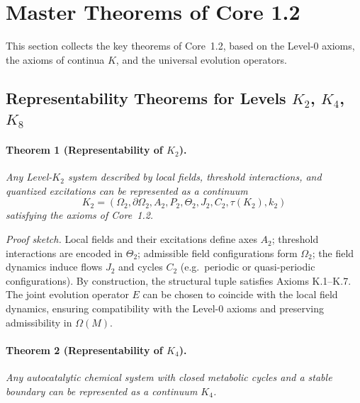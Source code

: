 \section{Master Theorems of Core 1.2}
\label{sec:theorems-master}

This section collects the key theorems of Core~1.2, based on the Level-0 axioms, the axioms of continua \(K\), and the universal evolution operators.

\subsection{Representability Theorems for Levels \texorpdfstring{\(K_2\)}{K_2}, \texorpdfstring{\(K_4\)}{K_4}, \texorpdfstring{\(K_8\)}{K_8}}

\paragraph{Theorem 1 (Representability of \texorpdfstring{\(K_2\)}{K_2}).}
\emph{Any Level-\(K_2\) system described by local fields, threshold interactions, and quantized excitations can be represented as a continuum}
\[
  K_2=(\Omega_2,\partial\Omega_2,A_2,P_2,\Theta_2,J_2,C_2,\tau(K_2),k_2)
\]
\emph{satisfying the axioms of Core~1.2.}

\emph{Proof sketch.}
Local fields and their excitations define axes \(A_2\); threshold interactions are encoded in \(\Theta_2\); admissible field configurations form \(\Omega_2\); the field dynamics induce flows \(J_2\) and cycles \(C_2\) (e.g.\ periodic or quasi-periodic configurations).
By construction, the structural tuple satisfies Axioms K.1–K.7.
The joint evolution operator \(E\) can be chosen to coincide with the local field dynamics, ensuring compatibility with the Level-0 axioms and preserving admissibility in \(\Omega(M)\).

\paragraph{Theorem 2 (Representability of \texorpdfstring{\(K_4\)}{K_4}).}
\emph{Any autocatalytic chemical system with closed metabolic cycles and a stable boundary can be represented as a continuum \(K_4\).}

